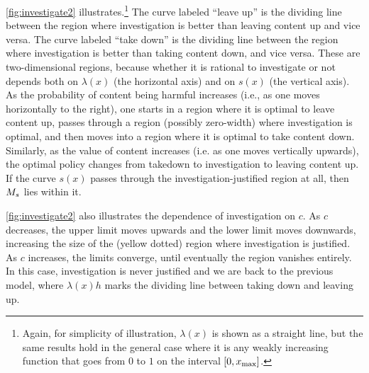 \autoref{fig:investigate2} illustrates.\footnote{Again, for simplicity of illustration, $\lambda(x)$ is shown as a straight line, but the same results hold in the general case where it is any weakly increasing function that goes from $0$ to $1$ on the interval $[0,x_{\text{max}}]$.} The curve labeled ``leave up'' is the dividing line between the region where investigation is better than leaving content up and vice versa. The curve labeled ``take down'' is the dividing line between the region where investigation is better than taking content down, and vice versa. These are two-dimensional regions, because whether it is rational to investigate or not depends both on $\lambda(x)$ (the horizontal axis) and on $s(x)$ (the vertical axis). As the probability of content being harmful increases (i.e., as one moves horizontally to the right), one starts in a region where it is optimal to leave content up, passes through a region (possibly zero-width) where investigation is optimal, and then moves into a region where it is optimal to take content down. Similarly, as the value of content increases (i.e. as one moves vertically upwards), the optimal policy changes from takedown to investigation to leaving content up. If the curve $s(x)$ passes through the investigation-justified region at all, then $M_s$ lies within it.

\autoref{fig:investigate2} also illustrates the dependence of investigation on $c$. As $c$ decreases, the upper limit moves upwards and the lower limit moves downwards, increasing the size of the (yellow dotted) region where investigation is justified. As $c$ increases, the limits converge, until eventually the region vanishes entirely. In this case, investigation is never justified and we are back to the previous model, where $\lambda(x)h$ marks the dividing line between taking down and leaving up.


